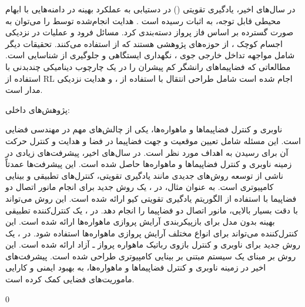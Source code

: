 \documentclass[a4paper]{article}
\begin{document}
{%
  
  در سال‌های اخیر، یادگیری تقویتی () در دستیابی به عملکرد بهینه در دامنه‌هایی با ابهام محیطی قابل توجه، به اثبات رسیده است  \cite{heess2017emergence, silver2017mastering}.
  هدایت انجام‌شده توسط  را می‌توان به صورت گسترده بر اساس فاز پرواز دسته‌بندی کرد.
  مسائل فرود \cite{furfaro2020adaptive, gaudet2020deep} 
   و عملیات در نزدیکی اجسام کوچک
   \cite{gaudet2020terminal, gaudet2020six}،
    از حوزه‌های پژوهشی هستند که از  استفاده می‌کنند.
  تحقیقات دیگر شامل مواجهه تداخل خارجی جوی \cite{gaudet2020reinforcement}،
   نگهداری ایستگاهی \cite{guzzetti2019reinforcement}  و جلوگیری از شناسایی \cite{reiter2020augmenting} است.
  مطالعاتی که فضاپیماهای رانشگر کم پیشران را در یک چارچوب دینامیکی چندبدنی با استفاده از RL اجام شده است شامل طراحی انتقال با استفاده از  
   \cite{dasstuart2020rapid}، 
     \cite{miller2019lowthrust}
      و  هدایت نزدیکی مدار  \cite{sullivan2020using} است.
      
      
      
      پژوهش‌های داخلی:
      
      
  ناوبری و کنترل فضاپیماها و ماهواره‌ها، یکی از چالش‌های مهم در مهندسی فضایی است. این مسئله شامل تعیین موقعیت و جهت فضاپیما در فضا و هدایت و کنترل حرکت آن برای رسیدن به اهداف مورد نظر است.
  در سال‌های اخیر، پیشرفت‌های زیادی در زمینه ناوبری و کنترل فضاپیماها و ماهواره‌ها حاصل شده است. این پیشرفت‌ها عمدتاً ناشی از توسعه روش‌های جدیدی مانند یادگیری تقویتی، کنترل‌های تطبیقی و بینایی کامپیوتری است.
  به عنوان مثال، در \cite{irani_1}، یک روش جدید برای انجام مانور اتصال دو فضاپیما با استفاده از الگوریتم یادگیری تقویتی کیو ارائه شده است. این روش می‌تواند با دقت بسیار بالایی، مانور اتصال دو فضاپیما را انجام دهد.
  در \cite{irani_2}، یک کنترل‌کننده تطبیقی بهینه بدون مدل برای بازپیکربندی آرایش پروازی ماهواره‌ها ارائه شده است. این کنترل‌کننده می‌تواند برای انواع مختلف آرایش پروازی ماهواره‌ها استفاده شود.
  در \cite{irani_3}، یک روش جدید برای ناوبری و کنترل بازوی رباتیک ماهواره پرواز ـ آزاد ارائه شده است. این روش بر مبنای یک سیستم مبتنی بر بینایی کامپیوتری طراحی شده است.
  پیشرفت‌های اخیر در زمینه ناوبری و کنترل فضاپیماها و ماهواره‌ها، به بهبود ایمنی و کارایی ماموریت‌های فضایی کمک کرده است.

}{0}{{}}
\end{document}
